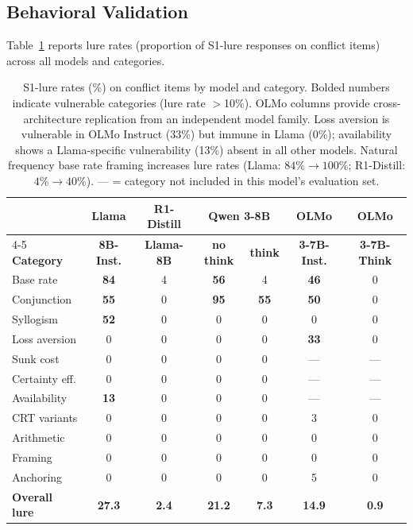 \documentclass[twocolumn,10pt]{article}
\begin{document}
\subsection{Behavioral Validation}
\label{sec:results_behavioral}

Table~\ref{tab:behavioral} reports lure rates (proportion of S1-lure
responses on conflict items) across all models and categories.

\begin{table}[t]
\centering
\caption{S1-lure rates (\%) on conflict items by model and category.
  Bolded numbers indicate vulnerable categories (lure rate $>$10\%).
  OLMo columns provide cross-architecture replication from an
  independent model family.  Loss aversion is vulnerable in OLMo
  Instruct (33\%) but immune in Llama (0\%); availability shows a
  Llama-specific vulnerability (13\%) absent in all other models.
  Natural frequency base rate framing increases lure rates
  (Llama: $84\% \to 100\%$; R1-Distill: $4\% \to 40\%$).
  --- = category not included in this model's evaluation set.}
\label{tab:behavioral}
\vspace{4pt}
\footnotesize
\begin{tabular}{lcccccc}
\toprule
& \textbf{Llama} & \textbf{R1-Distill} & \multicolumn{2}{c}{\textbf{Qwen 3-8B}} & \textbf{OLMo} & \textbf{OLMo} \\
\cmidrule(lr){4-5}
\textbf{Category} & \textbf{8B-Inst.} & \textbf{Llama-8B} & \textbf{no think} & \textbf{think} & \textbf{3-7B-Inst.} & \textbf{3-7B-Think} \\
\midrule
Base rate      & \textbf{84} & 4   & \textbf{56} & 4   & \textbf{46} & 0 \\
Conjunction    & \textbf{55} & 0   & \textbf{95} & \textbf{55} & \textbf{50} & 0 \\
Syllogism      & \textbf{52} & 0   & 0   & 0   & 0   & 0 \\
Loss aversion  & 0   & 0   & 0   & 0   & \textbf{33} & 0 \\
Sunk cost      & 0   & 0   & 0   & 0   & ---  & --- \\
Certainty eff. & 0   & 0   & 0   & 0   & ---  & --- \\
Availability   & \textbf{13} & 0   & 0   & 0   & ---  & --- \\
\midrule
CRT variants   & 0   & 0   & 0   & 0   & 3   & 0 \\
Arithmetic     & 0   & 0   & 0   & 0   & 0   & 0 \\
Framing        & 0   & 0   & 0   & 0   & 0   & 0 \\
Anchoring      & 0   & 0   & 0   & 0   & 5   & 0 \\
\midrule
\textbf{Overall lure} & \textbf{27.3} & \textbf{2.4} & \textbf{21.2} & \textbf{7.3} & \textbf{14.9} & \textbf{0.9} \\
\bottomrule
\end{tabular}
\end{table}
\end{document}
